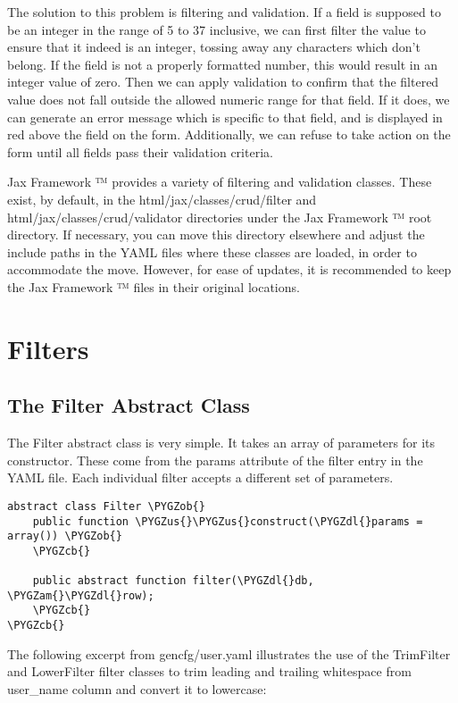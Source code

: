 \documentclass[letterpaper,10pt,english]{sphinxmanual}
\def\PYGZus{\char`\_}
\def\PYGZob{\char`\{}
\def\PYGZcb{\char`\}}
\def\PYGZam{\char`\&}
\def\PYGZdl{\char`\$}
\begin{document}
The solution to this problem is filtering and validation.  If a field is supposed to be an integer
in the range of 5 to 37 inclusive, we can first filter the value to ensure that it indeed is an
integer, tossing away any characters which don't belong.  If the field is not a properly formatted
number, this would result in an integer value of zero.  Then we can apply validation to confirm that
the filtered value does not fall outside the allowed numeric range for that field.  If it does, we
can generate an error message which is specific to that field, and is displayed in red above the
field on the form.  Additionally, we can refuse to take action on the form until all fields pass
their validation criteria.

Jax Framework ™ provides a variety of filtering and validation classes.  These exist, by
default, in the html/jax/classes/crud/filter and html/jax/classes/crud/validator directories under
the Jax Framework ™ root directory.  If necessary, you can move this directory elsewhere and
adjust the include paths in the YAML files where these classes are loaded, in order to accommodate
the move.  However, for ease of updates, it is recommended to keep the Jax Framework ™ files
in their original locations.


\section{Filters}
\label{jaxFrameworkGuide:filters}

\subsection{The Filter Abstract Class}
\label{jaxFrameworkGuide:the-filter-abstract-class}
The Filter abstract class is very simple.  It takes an array of parameters for its constructor.
These come from the params attribute of the filter entry in the YAML file.  Each individual filter
accepts a different set of parameters.

\begin{Verbatim}[commandchars=\\\{\}]
abstract class Filter \PYGZob{}
    public function \PYGZus{}\PYGZus{}construct(\PYGZdl{}params = array()) \PYGZob{}
    \PYGZcb{}

    public abstract function filter(\PYGZdl{}db, \PYGZam{}\PYGZdl{}row);
    \PYGZcb{}
\PYGZcb{}
\end{Verbatim}

The following excerpt from gencfg/user.yaml illustrates the use of the TrimFilter and LowerFilter
filter classes to trim leading and trailing whitespace from user\_name column and convert it to
lowercase:
\end{document}
